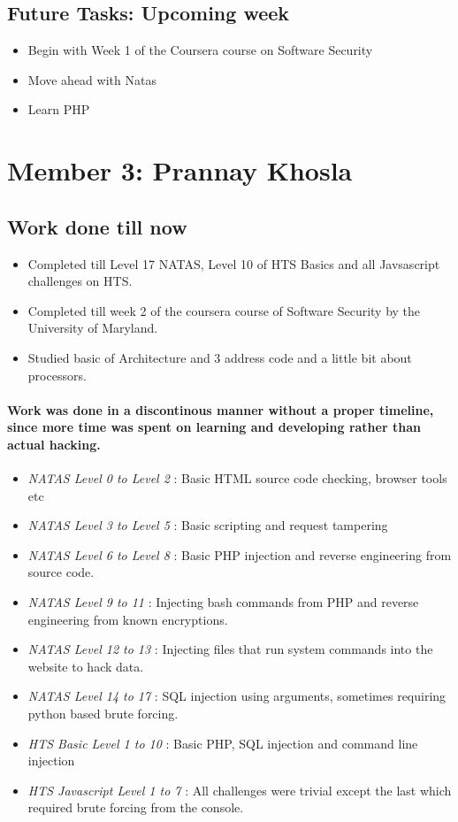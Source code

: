 \documentclass{article}
\begin{document}
\begin{itemize}
\subsection*{Future Tasks: Upcoming week}
\begin{itemize}
    \item Begin with Week 1 of the Coursera course on Software Security
    \item Move ahead with Natas
    \item Learn PHP
\end{itemize}

\newpage
\section*{Member 3: Prannay Khosla}
\subsection*{Work done till now}
\begin{itemize}
	\item Completed till Level 17 NATAS, Level 10 of HTS Basics and all Javsascript challenges on HTS.
	\item Completed till week 2 of the coursera course of Software Security by the  University of Maryland. 
	\item Studied basic of Architecture and 3 address code and a little bit about processors.
\end{itemize}
\paragraph{Work was done in a discontinous manner without a proper timeline, since more time was spent on learning and developing rather than actual hacking.}
\begin{itemize}
	\item \textit{NATAS Level 0 to Level 2} : Basic HTML source code checking, browser tools etc
	\item \textit{NATAS Level 3 to Level 5} : Basic scripting and request tampering
	\item \textit{NATAS Level 6 to Level 8} : Basic PHP injection and reverse engineering from source code. 
	\item \textit{NATAS Level 9 to 11} : Injecting bash commands from PHP and reverse engineering from known encryptions.
	\item \textit{NATAS Level 12 to 13} :  Injecting files that run system commands into the website to hack data. 
	\item \textit{NATAS Level 14 to 17} : SQL injection using arguments, sometimes requiring python based brute forcing. 
	\item \textit{HTS Basic Level 1 to 10} : Basic PHP, SQL injection and command line injection
	\item \textit{HTS Javascript Level 1 to 7} : All challenges were trivial except the last which required brute forcing from the console. 
\end{itemize}


\end{itemize}
\end{document}
